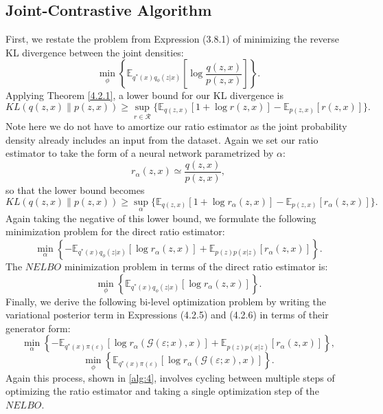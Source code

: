 \documentclass[honours,12pt, twoside]{unswthesis}
\newcommand{\E}{\mathbb{E}}
\numberwithin{equation}{section}
\theoremstyle{definition}
\begin{document}
\subsection{Joint-Contrastive Algorithm}\label{sec:4.2.3}
First, we restate the problem from Expression (3.8.1) of minimizing the reverse KL divergence between the joint densities:
\[\min_\phi \left\lbrace\mathbb{E}_{q^*(x)q_\phi(z|x)}\left[\log \frac{q(z,x)}{p(z,x)}\right]\right\rbrace.\]
Applying Theorem \ref{4.2.1}, a lower bound for our KL divergence is
\[KL(q(z,x)\|p(z,x))\geq \sup_{r\in \mathcal{R}}\{\mathbb{E}_{q(z,x)}[1+\log r(z,x)]-\mathbb{E}_{p(z,x)}[r(z,x)]\}.\]
Note here we do not have to amortize our ratio estimator as the joint probability density already includes an input from the dataset. Again we set our ratio estimator to take the form of a neural network parametrized by $\alpha$:
\[r_\alpha(z,x)\simeq \frac{q(z,x)}{p(z,x)},\]
so that the lower bound becomes
\[KL(q(z,x)\|p(z,x))\geq \sup_{\alpha}\{\mathbb{E}_{q(z,x)}[1+\log r_\alpha(z,x)]-\mathbb{E}_{p(z,x)}[r_\alpha(z,x)]\}.\]
Again taking the negative of this lower bound, we formulate the following minimization problem for the direct ratio estimator:
\begin{equation}
\min_\alpha\left\lbrace-\E_{q^*(x)q_\phi(z|x)}[\log r_\alpha(z,x)]+\E_{p(z)p(x|z)}[r_\alpha(z,x)]\right\rbrace.
\end{equation}
The $NELBO$ minimization problem in terms of the direct ratio estimator is:
\begin{equation}
\min_\phi \left\lbrace\mathbb{E}_{q^*(x)q_\phi(z|x)}[\log r_\alpha(z,x)]\right\rbrace.
\end{equation}
Finally, we derive the following bi-level optimization problem by writing the variational posterior term in Expressions (4.2.5) and (4.2.6) in terms of their generator form:
\[\min_\alpha \left\lbrace-\mathbb{E}_{q^*(x)\pi(\varepsilon)}[\log r_\alpha(\mathcal{G}(\varepsilon;x),x)]+\mathbb{E}_{p(z)p(x|z)}[r_\alpha(z,x)]\right\rbrace,\]
\[\min_\phi \left\lbrace\mathbb{E}_{q^*(x)\pi(\varepsilon)}[\log r_\alpha(\mathcal{G}(\varepsilon;x),x)]\right\rbrace.\]
Again this process, shown in \autoref{alg:4}, involves cycling between multiple steps of optimizing the ratio estimator and taking a single optimization step of the $NELBO$.
\end{document}
